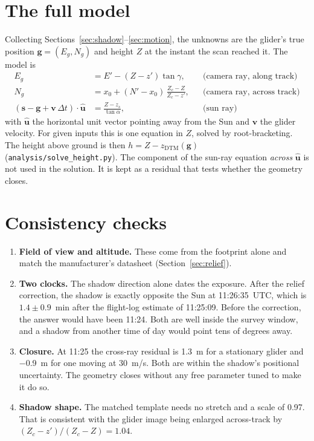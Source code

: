\documentclass[11pt,a4paper]{article}
\newcommand{\code}[1]{\texttt{#1}}
\begin{document}
\section{The full model}\label{sec:model}

Collecting Sections~\ref{sec:shadow}--\ref{sec:motion}, the unknowns are the glider's true position
$\mathbf g=(E_g,N_g)$ and height $Z$ at the instant the scan reached it. The model is
\begin{align}
  E_g &= E' - (Z - z')\tan\gamma, &&\text{(camera ray, along track)}\\
  N_g &= x_0 + (N' - x_0)\,\frac{Z_c - Z}{Z_c - z'}, &&\text{(camera ray, across track)}\\
  (\mathbf s - \mathbf g + \mathbf v\,\Delta t)\cdot\hat{\mathbf u} &= \frac{Z - z_s}{\tan\alpha},
      &&\text{(sun ray)}
\end{align}
with $\hat{\mathbf u}$ the horizontal unit vector pointing away from the Sun and $\mathbf v$ the glider velocity.
For given inputs this is one equation in $Z$, solved by root-bracketing. The height above ground is then
$h = Z - z_{\text{DTM}}(\mathbf g)$ (\code{analysis/solve\_height.py}). The component of the sun-ray equation
\emph{across} $\hat{\mathbf u}$ is not used in the solution. It is kept as a residual that tests whether the
geometry closes.

\section{Consistency checks}\label{sec:checks}

\begin{enumerate}
  \item \textbf{Field of view and altitude.} These come from the footprint alone and match the
        manufacturer's datasheet (Section~\ref{sec:relief}).
  \item \textbf{Two clocks.} The shadow direction alone dates the exposure. After the relief
        correction, the shadow is exactly opposite the Sun at 11:26:35~UTC, which is
        $1.4\pm0.9$~min after the flight-log estimate of 11:25:09. Before the correction, the
        answer would have been 11:24. Both are well inside the survey window, and a shadow from another time of
        day would point tens of degrees away.
  \item \textbf{Closure.} At 11:25 the cross-ray residual is \SI{+1.3}{m} for a stationary
        glider and \SI{-0.9}{m} for one moving at \SI{30}{m/s}. Both are within the shadow's
        positional uncertainty. The geometry closes without any free parameter tuned to make it do so.
  \item \textbf{Shadow shape.} The matched template needs no stretch and a scale of 0.97. That is
        consistent with the glider image being enlarged across-track by $(Z_c - z')/(Z_c - Z) = 1.04$.
\end{enumerate}
\end{document}
